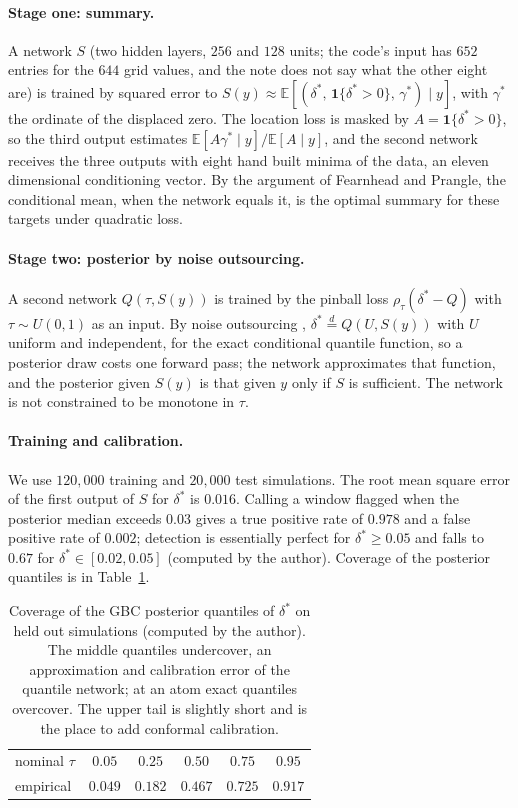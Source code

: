 \paragraph{Stage one: summary.} A network $S$ (two hidden layers, $256$ and $128$ units; the code's input has $652$ entries for the $644$ grid values, and the note does not say what the other eight are) is trained by squared error to $S(y)\approx\mathbb E[(\delta^\ast,\,\mathbf 1\{\delta^\ast>0\},\,\gamma^\ast)\mid y]$, with $\gamma^\ast$ the ordinate of the displaced zero. The location loss is masked by $A=\mathbf 1\{\delta^\ast>0\}$, so the third output estimates $\mathbb E[A\gamma^\ast\mid y]/\mathbb E[A\mid y]$, and the second network receives the three outputs with eight hand built minima of the data, an eleven dimensional conditioning vector. By the argument of Fearnhead and Prangle, the conditional mean, when the network equals it, is the optimal summary for these targets under quadratic loss.

\paragraph{Stage two: posterior by noise outsourcing.} A second network $Q(\tau,S(y))$ is trained by the pinball loss $\rho_\tau(\delta^\ast-Q)$ with $\tau\sim U(0,1)$ as an input. By noise outsourcing \cite{Kallenberg02}, $\delta^\ast\overset d=Q(U,S(y))$ with $U$ uniform and independent, for the exact conditional quantile function, so a posterior draw costs one forward pass; the network approximates that function, and the posterior given $S(y)$ is that given $y$ only if $S$ is sufficient. The network is not constrained to be monotone in $\tau$.

\paragraph{Training and calibration.} We use $120{,}000$ training and $20{,}000$ test simulations. The root mean square error of the first output of $S$ for $\delta^\ast$ is $0.016$. Calling a window flagged when the posterior median exceeds $0.03$ gives a true positive rate of $0.978$ and a false positive rate of $0.002$; detection is essentially perfect for $\delta^\ast\ge0.05$ and falls to $0.67$ for $\delta^\ast\in[0.02,0.05]$ (computed by the author). Coverage of the posterior quantiles is in Table~\ref{cf:tab:cov}.

\begin{table}[h]
\centering
\begin{tabular}{lccccc}
\toprule
nominal $\tau$ & $0.05$ & $0.25$ & $0.50$ & $0.75$ & $0.95$\\
empirical & $0.049$ & $0.182$ & $0.467$ & $0.725$ & $0.917$\\
\bottomrule
\end{tabular}
\caption{Coverage of the GBC posterior quantiles of $\delta^\ast$ on held out simulations (computed by the author). The middle quantiles undercover, an approximation and calibration error of the quantile network; at an atom exact quantiles overcover. The upper tail is slightly short and is the place to add conformal calibration.}
\label{cf:tab:cov}
\end{table}

